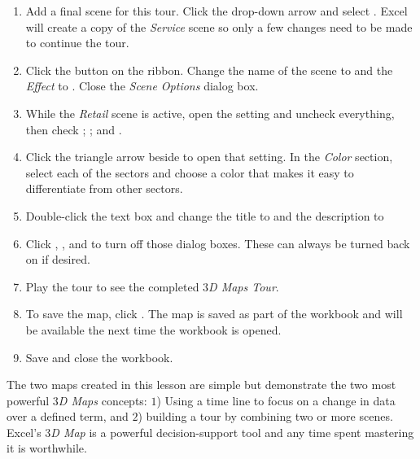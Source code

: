 \begin{enumerate}
	\item Add a final scene for this tour. Click the  drop-down arrow and select . Excel will create a copy of the \textit{Service} scene so only a few changes need to be made to continue the tour.
	\item Click the  button on the ribbon. Change the name of the scene to  and the \textit{Effect} to . Close the \textit{Scene Options} dialog box.
	\item While the \textit{Retail} scene is active, open the  setting and uncheck everything, then check ; ; and .
	\item Click the triangle arrow beside  to open that setting. In the \textit{Color} section, select each of the sectors and choose a color that makes it easy to differentiate from other sectors.
	\item Double-click the text box and change the title to  and the description to 
	
	\item Click , , and  to turn off those dialog boxes. These can always be turned back on if desired.
	\item Play the tour to see the completed \textit{$ 3 $D Maps Tour}.
	\item To save the map, click . The map is saved as part of the workbook and will be available the next time the workbook is opened.
	\item Save and close the  workbook.
	
\end{enumerate}

The two maps created in this lesson are simple but demonstrate the two most powerful \textit{$ 3 $D Maps} concepts: $ 1 $) Using a time line to focus on a change in data over a defined term, and $ 2 $) building a tour by combining two or more scenes. Excel's \textit{$ 3 $D Map} is a powerful decision-support tool and any time spent mastering it is worthwhile.

